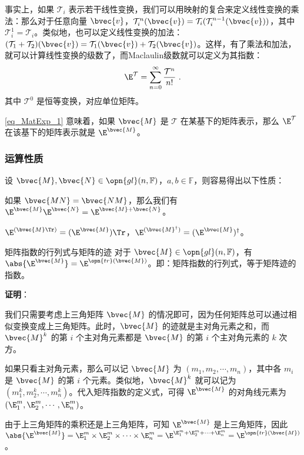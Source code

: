 事实上，如果 $\mathcal{T}_i$ 表示若干线性变换，我们可以用映射的复合来定义线性变换的乘法：那么对于任意向量 $\bvec{v}$，$\mathcal{T}^n_i(\bvec{v})=\mathcal{T}_i(\mathcal{T}^{n-1}_i(\bvec{v}))$，其中 $\mathcal{T}_i^1=\mathcal{T}_i$。类似地，也可以定义线性变换的加法：$(\mathcal{T}_1+\mathcal{T}_2)(\bvec{v})=\mathcal{T}_1(\bvec{v})+\mathcal{T}_2(\bvec{v})$。这样，有了乘法和加法，就可以计算线性变换的级数了，而Maclaulin级数就可以定义为其指数：
\begin{equation}
\E^\mathcal{T}=\sum\limits_{n=0}^\infty \frac{\mathcal{T}^n}{n!}~.
\end{equation}
其中 $\mathcal{T}^0$ 是恒等变换，对应单位矩阵。

\autoref{eq_MatExp_1} 意味着，如果 $\bvec{M}$ 是 $\mathcal{T}$ 在某基下的矩阵表示，那么 $\E^\mathcal{T}$ 在该基下的矩阵表示就是 $\E^{\bvec{M}}$。

\subsubsection{运算性质}

设 $\bvec{M}, \bvec{N}\in \opn{gl}(n, \mathbb{F})$，$a, b\in\mathbb{F}$，则容易得出以下性质：

如果 $\bvec{MN}=\bvec{NM}$，那么我们有 $\E^{\bvec{M}}\E^{\bvec{N}}=\E^{\bvec{M}+\bvec{N}}$。

$\E^{(\bvec{M}\Tr)}=(\E^{\bvec{M}})\Tr$，$\E^{(\bvec{M}^\dagger)}=({\E^{\bvec{M}}})^\dagger$。

\begin{theorem}{矩阵指数的行列式与矩阵的迹}\label{the_MatExp_2}
对于 $\bvec{M}\in\opn{gl}(n, \mathbb{F})$，有 $\abs{\E^{\bvec{M}}}=\E^{\opn{tr}(\bvec{M})}$。即：矩阵指数的行列式，等于矩阵迹的指数。
\end{theorem}

\textbf{证明}：

我们只需要考虑上三角矩阵 $\bvec{M}$ 的情况即可，因为任何矩阵总可以通过相似变换变成上三角矩阵。此时，$\bvec{M}$ 的迹就是主对角元素之和，而 $\bvec{M}^k$ 的第 $i$ 个主对角元素都是 $\bvec{M}$ 的第 $i$ 个主对角元素的 $k$ 次方。

如果只看主对角元素，那么可以记 $\bvec{M}$ 为 $(m_1, m_2,\cdots,m_n)$，其中各 $m_i$ 是 $\bvec{M}$ 的第 $i$ 个元素。类似地，$\bvec{M}^k$ 就可以记为 $(m_1^k, m_2^k,\cdots,m_n^k)$。代入矩阵指数的定义式，可得 $\E^{\bvec{M}}$ 的对角线元素为 $(\E^m_1, \E^m_2,\cdots, \E^m_n)$。

由于上三角矩阵的乘积还是上三角矩阵，可知 $\E^{\bvec{M}}$ 是上三角矩阵，因此 $\abs{\E^{\bvec{M}}}=\E^m_1\times\E^m_2\times\cdots\times\E^m_n=\E^{\E^m_1+\E^m_2+\cdots+\E^m_n}=\E^{\opn{tr}(\bvec{M})}$。

